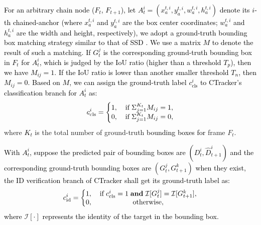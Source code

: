 \documentclass[../arXiv_main.tex]{subfiles}
\newcommand{\CRyang}[1]{\textcolor{black}{#1}}
\begin{document}
\CRyang{For an arbitrary chain node ($F_t$, $F_{t+1}$), let $A_t^i=(x^{t,i}_a, y^{t,i}_a, w^{t,i}_a, h^{t,i}_a)$ denote its $i$-th chained-anchor (where $x^{t,i}_a$ and $y^{t,i}_a$ are the box center coordinates; $w^{t,i}_a$ and $h^{t,i}_a$ are the width and height, respectively), we adopt a ground-truth bounding box matching strategy similar to that of SSD \cite{liu2016ssd}. We use a matrix $M$ to denote the result of such a matching. If $G_t^j$ is the corresponding ground-truth bounding box in $F_t$ for $A_t^i$, which is judged by the IoU ratio (higher than a threshold $T_p$), then we have $M_{ij} = 1$. If the IoU ratio is lower than another smaller threshold $T_n$, then $M_{ij} = 0$. Based on $M$, we can assign the ground-truth label $c_\mathrm{cls}^i$ to CTracker's classification branch for $A_t^i$ as:} \begin{equation}
\CRyang{c}_\mathrm{cls}^i = \left\{\begin{matrix}
1,\:  & \mathrm{if \: \Sigma}_{j=1}^{\CRyang{K_t}} \CRyang{M_{ij}} = 1, \\ 
0,\: & \mathrm{if \: \Sigma}_{j=1}^{\CRyang{K_t}} \CRyang{M_{ij}} = 0,
\end{matrix}\right.
\end{equation}  
where \CRyang{$K_t$} is the total number of ground-truth \CRyang{bounding boxes for} frame $F_t$. 


\CRyang{With $A_t^i$, suppose the predicted pair of bounding boxes are $(D_t^i, \hat{D}_{t+1}^i)$ and the corresponding ground-truth bounding boxes are $(G_t^j, G_{t+1}^k)$ when they exist, the ID verification branch of CTracker shall get its ground-truth label as:}
\begin{equation}
\CRyang{c}_\mathrm{id}^i = \left\{\begin{matrix}
1,\:  & \mathrm{if} \: \CRyang{c}_\mathrm{cls}^i = 1 \;\mathrm{\mathbf{ and }} \; \mathcal{I}[G_t^j] = \mathcal{I}[G_{t+1}^k], \\ 
0,\: & \mathrm{otherwise},
\end{matrix}\right.
\end{equation}
\CRyang{where $\mathcal{I}[\cdot]$ represents the identity of the target in the bounding box.}
\end{document}
